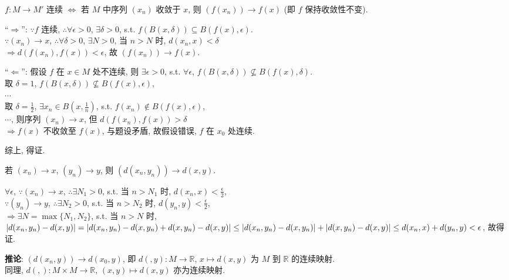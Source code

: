 \documentclass{note}
\begin{document}
\begin{thm}
    $f:M\rightarrow M'$ 连续 $\Longleftrightarrow$ 若 $M$ 中序列 $(x_n)$ 收敛于 $x$, 则 $(f(x_n))\rightarrow f(x)$ (即 $f$ 保持收敛性不变).
\end{thm}
\begin{pf}
    ``$\Longrightarrow$'': $\because f$ 连续, $\therefore\forall\epsilon>0$, $\exists\delta>0$, s.t. $f(B(x,\delta))\subseteq B(f(x),\epsilon)$.\\
    $\because(x_n)\rightarrow x$, $\therefore\forall\delta>0$, $\exists N>0$, 当 $n>N$ 时, $d(x_n,x)<\delta$\\
    $\Longrightarrow d(f(x_n),f(x))<\epsilon$, 故 $(f(x_n))\rightarrow f(x)$.

    ``$\Longleftarrow$'': 假设 $f$ 在 $x\in M$ 处不连续, 则 $\exists\epsilon>0$, s.t. $\forall\epsilon$, $f(B(x,\delta))\nsubseteq B(f(x),\delta)$.\\
    取 $\delta=1$, $f(B(x,\delta))\nsubseteq B(f(x),\epsilon)$,\\
    $\cdots$\\
    取 $\delta=\frac{1}{2}$, $\exists x_n\in B(x,\frac{1}{n})$, s.t. $f(x_n)\notin B(f(x),\epsilon)$,\\
    $\cdots$, 则序列 $(x_n)\rightarrow x$, 但 $d(f(x_n),f(x))>\delta$\\
    $\Longrightarrow f(x)$ 不收敛至 $f(x)$, 与题设矛盾, 故假设错误, $f$ 在 $x_0$ 处连续.

    综上, 得证.
\end{pf}

\begin{thm}[(课本定理 12.5)]
    若 $(x_n)\rightarrow x$, $(y_n)\rightarrow y$, 则 $(d(x_n,y_n))\rightarrow d(x,y)$.
\end{thm}
\begin{pf}
    $\forall\epsilon$, $\because(x_n)\rightarrow x$, $\therefore\exists N_1>0$, s.t. 当 $n>N_1$ 时, $d(x_n,x)<\frac{\epsilon}{2}$,\\
    $\because(y_n)\rightarrow y$, $\therefore\exists N_2>0$, s.t. 当 $n>N_2$ 时, $d(y_n,y)<\frac{\epsilon}{2}$,\\
    $\Longrightarrow\exists N=\max\{N_1,N_2\}$, s.t. 当 $n>N$ 时, $\left\lvert d(x_n,y_n)-d(x,y)\right\rvert=\left\lvert d(x_n,y_n)-d(x,y_n)+d(x,y_n)-d(x,y)\right\rvert\leq\left\lvert d(x_n,y_n)-d(x,y_n)\right\rvert+\left\lvert d(x,y_n)-d(x,y)\right\rvert\leq d(x_n,x)+d(y_n,y)<\epsilon$, 故得证.
\end{pf}

\textbf{推论}: $(d(x_n,y))\rightarrow d(x_0,y)$, 即 $d(,y):M\rightarrow\mathbb{R}$, $x\mapsto d(x,y)$ 为 $M$ 到 $\mathbb{R}$ 的连续映射.\\
同理, $d(,):M\times M\rightarrow\mathbb{R}$, $(x,y)\mapsto d(x,y)$ 亦为连续映射.
\end{document}
